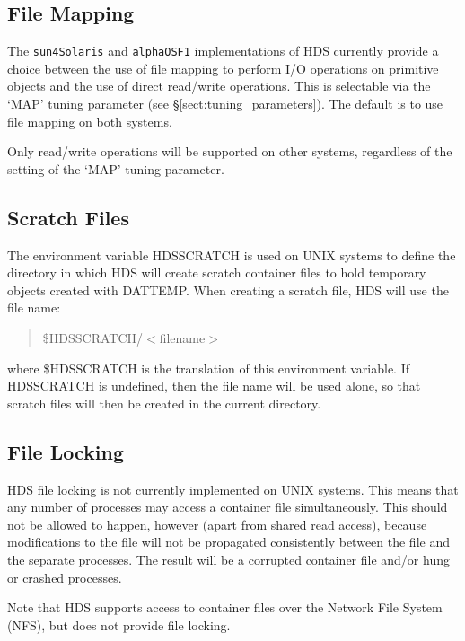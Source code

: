 \documentclass[twoside,11pt]{article}
\newcommand{\htmlref}[2]{#1}
\newcommand{\xlabel}[1]{}
\renewcommand{\_}{\texttt{\symbol{95}}}
\newcommand{\hi}[1]{{\tt{#1}}}
\begin{document}
\subsection{\xlabel{file_mapping}\label{sect:system_map}File Mapping}

The \hi{sun4\_Solaris} and \hi{alpha\_OSF1} implementations of HDS
currently provide a choice between the use of file mapping to perform
I/O operations on primitive objects and the use of direct read/write
operations. This is selectable via the `MAP' tuning parameter (see
\S\ref{sect:tuning_parameters}). The default is to use file mapping on
both systems.

Only read/write operations will be supported on other systems,
regardless of the setting of the `MAP' tuning parameter.

\subsection{\xlabel{scratch_files}Scratch Files}

The environment variable HDS\_SCRATCH is used on UNIX systems to
define the directory in which HDS will create scratch container files
to hold temporary objects created with
\htmlref{DAT\_TEMP}{DAT_TEMP}. When creating a scratch file, HDS will
use the file name:

\begin{quote}
\$HDS\_SCRATCH/$<$filename$>$
\end{quote}

where \$HDS\_SCRATCH is the translation of this environment
variable. If HDS\_SCRATCH is undefined, then the file name will be
used alone, so that scratch files will then be created in the current
directory.

\subsection{\xlabel{file_locking}File Locking}

HDS file locking is not currently implemented on UNIX systems. This
means that any number of processes may access a container file
simultaneously. This should not be allowed to happen, however (apart
from shared read access), because modifications to the file will not
be propagated consistently between the file and the separate
processes. The result will be a corrupted container file and/or hung
or crashed processes.

Note that HDS supports access to container files over the Network File
System (NFS), but does not provide file locking.
\end{document}
